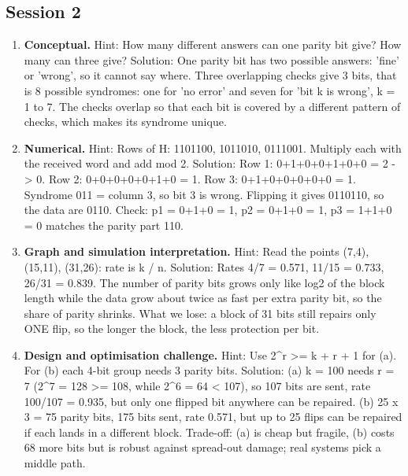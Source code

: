 \documentclass[11pt,a4paper]{article}
\begin{document}
\subsection*{Session 2}
\begin{enumerate}[nosep]
\item \textbf{Conceptual.} Hint: How many different answers can one parity bit give? How many can three give? Solution: One parity bit has two possible answers: 'fine' or 'wrong', so it cannot say where. Three overlapping checks give 3 bits, that is 8 possible syndromes: one for 'no error' and seven for 'bit k is wrong', k = 1 to 7. The checks overlap so that each bit is covered by a different pattern of checks, which makes its syndrome unique.
\item \textbf{Numerical.} Hint: Rows of H: 1101100, 1011010, 0111001. Multiply each with the received word and add mod 2. Solution: Row 1: 0+1+0+0+1+0+0 = 2 -\textgreater{} 0. Row 2: 0+0+0+0+0+1+0 = 1. Row 3: 0+1+0+0+0+0+0 = 1. Syndrome 011 = column 3, so bit 3 is wrong. Flipping it gives 0110110, so the data are 0110. Check: p1 = 0+1+0 = 1, p2 = 0+1+0 = 1, p3 = 1+1+0 = 0 matches the parity part 110.
\item \textbf{Graph and simulation interpretation.} Hint: Read the points (7,4), (15,11), (31,26): rate is k / n. Solution: Rates 4/7 = 0.571, 11/15 = 0.733, 26/31 = 0.839. The number of parity bits grows only like log2 of the block length while the data grow about twice as fast per extra parity bit, so the share of parity shrinks. What we lose: a block of 31 bits still repairs only ONE flip, so the longer the block, the less protection per bit.
\item \textbf{Design and optimisation challenge.} Hint: Use 2\textasciicircum{}r \textgreater{}= k + r + 1 for (a). For (b) each 4-bit group needs 3 parity bits. Solution: (a) k = 100 needs r = 7 (2\textasciicircum{}7 = 128 \textgreater{}= 108, while 2\textasciicircum{}6 = 64 \textless{} 107), so 107 bits are sent, rate 100/107 = 0.935, but only one flipped bit anywhere can be repaired. (b) 25 x 3 = 75 parity bits, 175 bits sent, rate 0.571, but up to 25 flips can be repaired if each lands in a different block. Trade-off: (a) is cheap but fragile, (b) costs 68 more bits but is robust against spread-out damage; real systems pick a middle path.
\end{enumerate}
\end{document}

